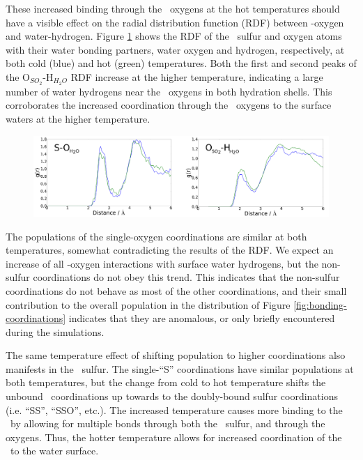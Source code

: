 These increased binding through the \suldiox~oxygens at the hot temperatures should have a visible effect on the radial distribution function (RDF) between \suldiox-oxygen and water-hydrogen. Figure \ref{fig:rdf} shows the RDF of the \suldiox~sulfur and oxygen atoms with their water bonding partners, water oxygen and hydrogen, respectively, at both cold (blue) and hot (green) temperatures. Both the first and second peaks of the O$_{SO_2}$-H$_{H_2O}$ RDF increase at the higher temperature, indicating a large number of water hydrogens near the \suldiox~oxygens in both hydration shells. This corroborates the increased coordination through the \suldiox~oxygens to the surface waters at the higher temperature.

\begin{figure}[h!]
	\begin{center}
		\includegraphics[scale=1.0]{images/rdf/rdf-small.png}
		\caption{}
		\label{fig:rdf}
	\end{center}
\end{figure}

The populations of the single-oxygen coordinations are similar at both temperatures, somewhat contradicting the results of the RDF. We expect an increase of all \suldiox-oxygen interactions with surface water hydrogens, but the non-sulfur coordinations do not obey this trend. This indicates that the non-sulfur coordinations do not behave as most of the other coordinations, and their small contribution to the overall population in the distribution of Figure \ref{fig:bonding-coordinations} indicates that they are anomalous, or only briefly encountered during the simulations.

The same temperature effect of shifting population to higher coordinations also manifests in the \suldiox~sulfur. The single-``S'' coordinations have similar populations at both temperatures, but the change from cold to hot temperature shifts the unbound \suldiox~coordinations up towards to the doubly-bound sulfur coordinations (i.e. ``SS'', ``SSO'', etc.). The increased temperature causes more binding to the \suldiox~by allowing for multiple bonds through both the \suldiox~sulfur, and through the oxygens. Thus, the hotter temperature allows for increased coordination of the \suldiox~to the water surface.

